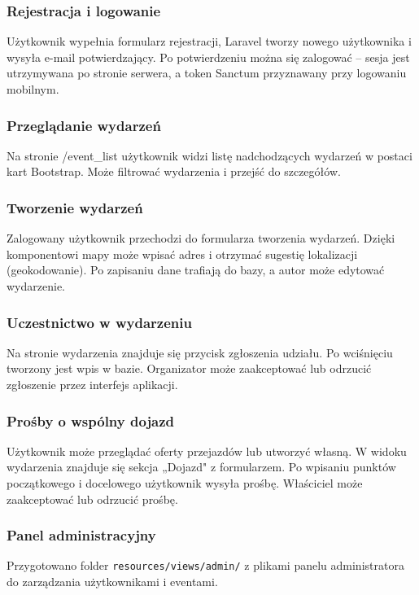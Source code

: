 \documentclass[12pt,a4paper]{article}
\begin{document}
\subsubsection{Rejestracja i logowanie}
Użytkownik wypełnia formularz rejestracji, Laravel tworzy nowego użytkownika i wysyła e-mail potwierdzający. Po potwierdzeniu można się zalogować -- sesja jest utrzymywana po stronie serwera, a token Sanctum przyznawany przy logowaniu mobilnym.

\subsubsection{Przeglądanie wydarzeń}
Na stronie /event_list użytkownik widzi listę nadchodzących wydarzeń w postaci kart Bootstrap. Może filtrować wydarzenia i przejść do szczegółów.

\subsubsection{Tworzenie wydarzeń}
Zalogowany użytkownik przechodzi do formularza tworzenia wydarzeń. Dzięki komponentowi mapy może wpisać adres i otrzymać sugestię lokalizacji (geokodowanie). Po zapisaniu dane trafiają do bazy, a autor może edytować wydarzenie.

\subsubsection{Uczestnictwo w wydarzeniu}
Na stronie wydarzenia znajduje się przycisk zgłoszenia udziału. Po wciśnięciu tworzony jest wpis w bazie. Organizator może zaakceptować lub odrzucić zgłoszenie przez interfejs aplikacji.

\subsubsection{Prośby o wspólny dojazd}
Użytkownik może przeglądać oferty przejazdów lub utworzyć własną. W widoku wydarzenia znajduje się sekcja „Dojazd" z formularzem. Po wpisaniu punktów początkowego i docelowego użytkownik wysyła prośbę. Właściciel może zaakceptować lub odrzucić prośbę.

\subsubsection{Panel administracyjny}
Przygotowano folder \texttt{resources/views/admin/} z plikami panelu administratora do zarządzania użytkownikami i eventami.
\end{document}
